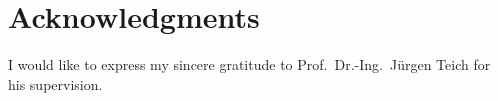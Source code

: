 \chapter*{Acknowledgments}
I would like to express my sincere gratitude to Prof.~Dr.-Ing.~J{\"u}rgen Teich for his supervision.
